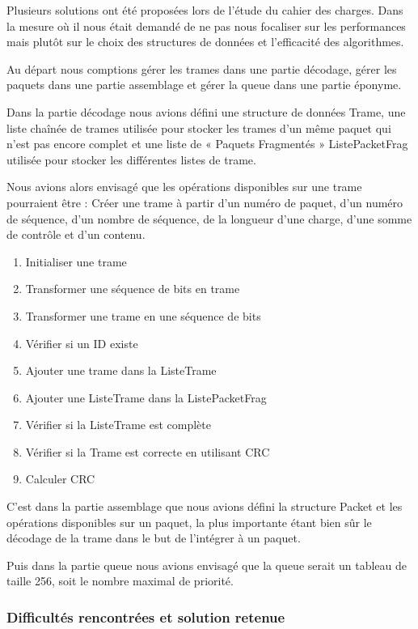\documentclass[a4paper,11pt]{article}
\begin{document}
Plusieurs solutions ont été proposées lors de l'étude du cahier des charges. Dans la mesure où il nous était demandé de ne pas nous focaliser sur les performances mais plutôt sur le choix des structures de données et l'efficacité des algorithmes.

Au départ nous comptions gérer les trames dans une partie décodage, gérer les paquets dans une partie assemblage et gérer la queue dans une partie éponyme.
 
Dans la partie décodage nous avions défini une structure de données Trame, une liste chaînée de trames utilisée pour stocker les trames d'un même paquet qui n'est pas encore complet et une liste de « Paquets Fragmentés » ListePacketFrag utilisée pour stocker les différentes listes de trame.


Nous avions alors envisagé que les opérations disponibles sur une trame pourraient être :
Créer une trame à partir d'un numéro de paquet, d'un numéro de séquence, d'un nombre de séquence, de la longueur d'une charge, d'une somme de contrôle et d'un contenu.
\begin{enumerate}
 \item Initialiser une trame
 \item Transformer une séquence de bits en trame
 \item Transformer une trame en une séquence de bits
 \item Vérifier si un ID existe
 \item Ajouter une trame dans la ListeTrame
 \item Ajouter une ListeTrame dans la ListePacketFrag
 \item Vérifier si la ListeTrame est complète
 \item Vérifier si la Trame est correcte en utilisant CRC
 \item Calculer CRC
\end{enumerate}

C'est dans la partie assemblage que nous avions défini la structure Packet et les opérations disponibles sur un paquet, la plus importante étant bien sûr le décodage de la trame dans le but de l'intégrer à un paquet.

Puis dans la partie queue nous avions envisagé que la queue serait un tableau de taille 256, soit le nombre maximal de priorité. 

\subsubsection{Difficultés rencontrées et solution retenue}
\end{document}
